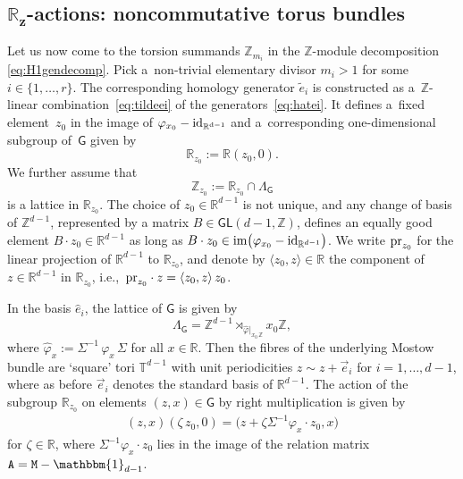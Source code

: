 \documentclass[pdftex]{sigma}
\numberwithin{equation}{section}
\newcommand{\Z}{\zed}
\def\Id{{\rm id}}
\newcommand{\unit}{\mathbbm{1}} 			%
\newcommand{\sfG}{\mathsf{G}}
\newcommand{\sfGL}{\mathsf{GL}}
\newcommand{\ttM}{\mathtt{M}}
\newcommand{\R}{\real}
\newcommand{\zed}{{\mathbb Z}} %
\newcommand{\real}{{\mathbb R}} %
\newcommand{\torus}{{\mathbb T}} %
\newcommand{\proj}{{\rm pr}}
\begin{document}
\subsection[$\real_z$-actions: noncommutative torus bundles]{$\boldsymbol{\real_z}$-actions: noncommutative torus bundles}\label{sec:Rzgen}

Let us now come to the torsion summands $\Z_{m_i}$ in the
$\Z$-module decomposition \eqref{eq:H1gendecomp}. Pick a~non-trivial
elementary divisor $m_i>1$ for some $i\in\{1,\dots,r\}$. The
corresponding homology generator $\tilde e_i$ is constructed as a~$\Z$-linear combination~\eqref{eq:tildeei} of the generators~\eqref{eq:hatei}. It defines a~fixed
element~$z_0$ in the image of $\varphi_{x_0}-\rm{id}_{\R^{d-1}}$ and a~corresponding one-dimensional subgroup of~$\sfG$ given by
\[
\R_{z_0} := \R (z_0,0) .
\]
We further assume that
\[
\Z_{ z_0} := \R_{ z_0}\cap\Lambda_\sfG
\]
is a lattice in $\R_{z_0}$.
The choice of $z_0\in\R^{d-1}$ is not unique, and
any change of basis of $\Z^{d-1}$, represented by a matrix
$B\in\sfGL(d-1,\Z)$, defines an equally good element $B\cdot
z_0\in\R^{d-1}$ as long as $B\cdot
z_0\in{\rm im}\big(\varphi_{x_0}-\Id_{\R^{d-1}}\big)$. We write $\proj_{z_0}$ for the
linear projection of $\R^{d-1}$ to $\R_{z_0}$, and denote by $\langle
z_0,z\rangle\in\R$ the component of $z\in\R^{d-1}$ in $\R_{z_0}$,
i.e.,~$\proj_{z_0}\cdot z = \langle z_0,z\rangle \, z_0$.

In the basis $\hat e_i$, the lattice of $\sfG$ is given by
\[
\Lambda_\sfG=\Z^{d-1}\rtimes_{\hat\varphi|_{x_0\,\Z}} x_0 \Z ,
\]
where $\hat\varphi_x:=\Sigma^{-1}\,\varphi_x\,\Sigma$ for all
$x\in\R$. Then the fibres of the underlying Mostow bundle are `square' tori
$\torus^{d-1}$ with unit periodicities $ z\sim z+\vec
e_i$ for $i=1,\dots,d-1$, where as
before $\vec e_i$ denotes the standard basis of
$\R^{d-1}$. The action of the
subgroup $\R_{ z_0}$ on
elements $(z,x)\in\sfG$ by right multiplication is given by
\begin{gather}\label{eq:Rz0action}
(z,x) (\zeta\,z_0,0) = \big(z+\zeta \Sigma^{-1} \varphi_x\cdot
z_0,x\big)
\end{gather}
for $\zeta\in\R$, where $\Sigma^{-1} \varphi_x\cdot z_0$ lies in the
image of the relation matrix ${\tt A}=\ttM-\unit_{d-1}$.
\end{document}
